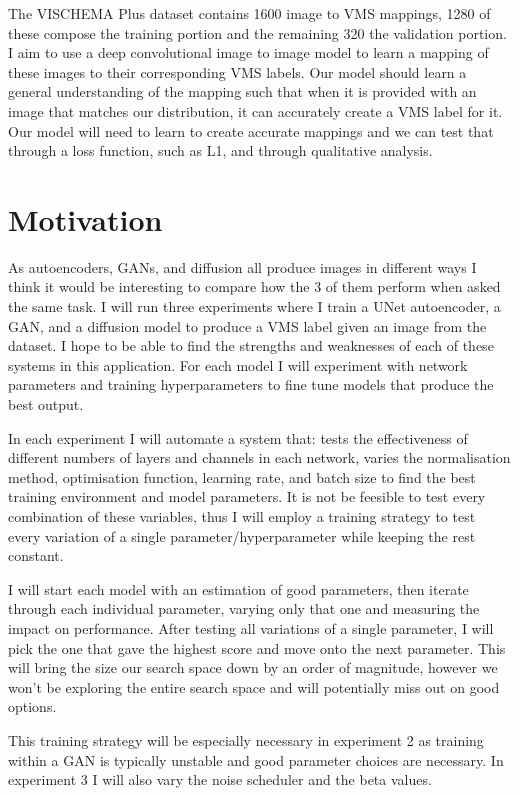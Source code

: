 \documentclass{UoYCSproject}
\begin{document}
The VISCHEMA Plus dataset contains 1600 image to VMS mappings, 1280 of these compose the training portion and the remaining 320 the validation portion. I aim to use a deep convolutional image to image model to learn a mapping of these images to their corresponding VMS labels. Our model should learn a general understanding of the mapping such that when it is provided with an image that matches our distribution, it can accurately create a VMS label for it. Our model will need to learn to create accurate mappings and we can test that through a loss function, such as L1, and through qualitative analysis.

\section{Motivation}

As autoencoders, GANs, and diffusion all produce images in different ways I think it would be interesting to compare how the 3 of them perform when asked the same task. I will run three experiments where I train a UNet autoencoder, a GAN, and a diffusion model to produce a VMS label given an image from the dataset. I hope to be able to find the strengths and weaknesses of each of these systems in this application. For each model I will experiment with network parameters and training hyperparameters to fine tune models that produce the best output.


In each experiment I will automate a system that: tests the effectiveness of different numbers of layers and channels in each network, varies the normalisation method, optimisation function, learning rate, and batch size to find the best training environment and model parameters. It is not be feesible to test every combination of these variables, thus I will employ a training strategy to test every variation of a single parameter/hyperparameter while keeping the rest constant.


I will start each model with an estimation of good parameters, then iterate through each individual parameter, varying only that one and measuring the impact on performance. After testing all variations of a single parameter, I will pick the one that gave the highest score and move onto the next parameter. This will bring the size our search space down by an order of magnitude, however we won't be exploring the entire search space and will potentially miss out on good options. 


This training strategy will be especially necessary in experiment 2 as training within a GAN is typically unstable and good parameter choices are necessary. In experiment 3 I will also vary the noise scheduler and the beta values.
\end{document}
